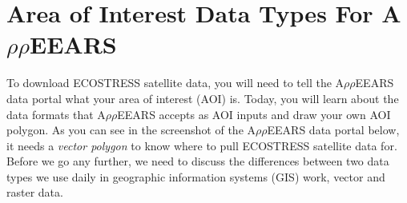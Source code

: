 \documentclass[oneside,a4paper,11pt,explicit]{book}
\begin{document}
	\noindent{}
	
	\vspace{1 em}

	\section{Area of Interest Data Types For A$\rho\rho$EEARS}

To download ECOSTRESS satellite data, you will need to tell the A$\rho\rho$EEARS data portal what your area of interest (AOI) is. Today, you will learn about the data formats that A$\rho\rho$EEARS accepts as AOI inputs and draw your own AOI polygon. As you can see in the screenshot of the A$\rho\rho$EEARS data portal below, it needs a \textit{vector polygon} to know where to pull ECOSTRESS satellite data for. Before we go any further, we need to discuss the differences between two data types we use daily in geographic information systems (GIS) work, vector and raster data.
\end{document}
